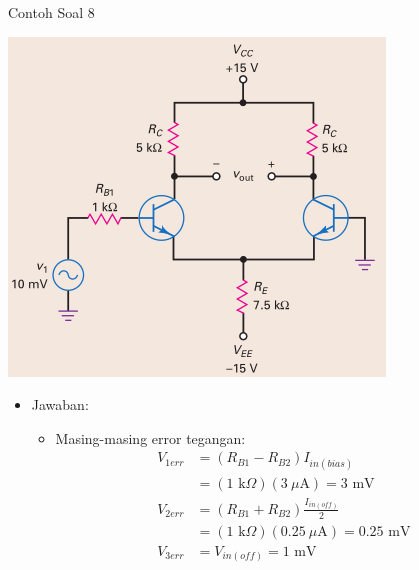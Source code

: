 \documentclass[aspectratio=169]{beamer}
\begin{document}
\begin{frame}{Contoh Soal 8}
	\begin{multicols}{2}
		\begin{center}
			\includegraphics[height=0.7\textheight]{gambar/01.diff-amp/01.latihan_soal_8}
		\end{center}
		\columnbreak
		\begin{itemize}
			\item Jawaban:
			\begin{itemize}
				\item Masing-masing error tegangan:
				\begin{align*}
					V_{1err} &= (R_{B1} - R_{B2}) I_{in(bias)} \\
					&= (1 \text{ k}\Omega)(3~\mu\text{A}) = 3 \text{ mV} \\
					V_{2err} &= (R_{B1} + R_{B2}) \frac{I_{in(off)}}{2} \\
					&= (1 \text{ k}\Omega)(0.25~\mu\text{A}) = 0.25 \text{ mV} \\
					V_{3err} &= V_{in(off)} = 1 \text{ mV}
				\end{align*}
			\end{itemize}
		\end{itemize}
	\end{multicols}
\end{frame}
\end{document}
